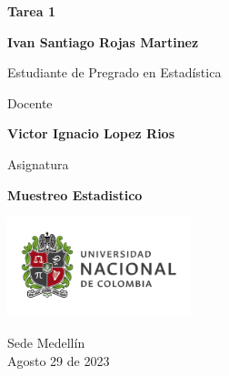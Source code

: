 \begin{titlepage}
   \Large{
   \begin{center}
       \vspace*{1cm}

       \textbf{Tarea 1}
       
       \vspace{1.5cm}
        
        
       
       \textbf{Ivan Santiago Rojas Martinez} \\
        
       \vspace{1cm}
       
       Estudiante de Pregrado en Estadística
       
       \vspace{1cm}
       
       Docente
       
       \vspace{0.5cm}

       \textbf{Victor Ignacio Lopez Rios}
       
       \vspace{0.4cm}

       \vspace{1.5cm}
       
       Asignatura
       
       \vspace{0.5cm}

       \textbf{Muestreo Estadistico}

       \vfill

            
       \vspace{0.1cm}
     
       \includegraphics[width=0.4\textwidth]{DocumentFormat/logounal.png}
            
       Sede Medellín\\
       Agosto 29 de 2023
       
   \end{center}
   }
\end{titlepage}
